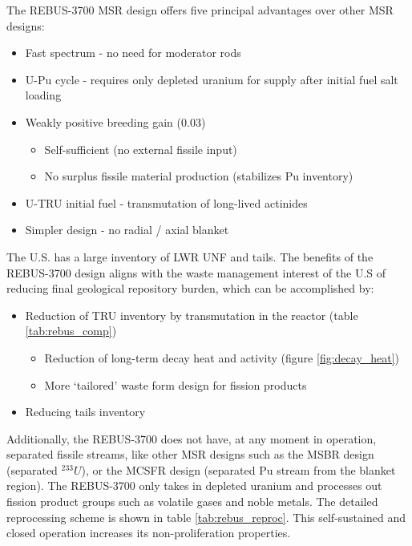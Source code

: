 The REBUS-3700 \gls{MSR} design offers five principal
advantages over other \gls{MSR} designs:
\begin{itemize}
	\item Fast spectrum - no need for moderator rods 
	\item U-Pu cycle - requires only depleted uranium for supply after initial fuel salt loading
	\item Weakly positive breeding gain (0.03)
	\begin{itemize}
		\item Self-sufficient (no external fissile input)
		\item No surplus fissile material production (stabilizes Pu inventory)
	\end{itemize}
	\item U-\gls{TRU} initial fuel - transmutation of long-lived actinides
	\item Simpler design - no radial / axial blanket
\end{itemize}

The U.S. has a large inventory of \gls{LWR} \gls{UNF} and tails. The benefits
of the REBUS-3700 design aligns with the waste management interest
of the U.S of reducing final geological repository burden, which can be
accomplished by:

\begin{itemize}
	\item Reduction of \gls{TRU} inventory by transmutation in the reactor (table \ref{tab:rebus_comp})
	\begin{itemize}
		\item Reduction of long-term decay heat and activity (figure \ref{fig:decay_heat})
		\item More `tailored' waste form design for fission products
	\end{itemize}
	\item Reducing tails inventory
\end{itemize}

Additionally, the REBUS-3700 does not have, at any moment in
operation, separated fissile streams, like other \gls{MSR} designs
such as the \gls{MSBR} design \cite{robertson_conceptual_1971} (separated 
$^{233}U$),
or the \gls{MCSFR} design \cite{smith_assessment_1974} (separated Pu stream from the blanket region).
The REBUS-3700 only takes in depleted uranium and processes out
fission product groups such as volatile gases and noble metals.
The detailed reprocessing scheme is shown
in table \ref{tab:rebus_reproc}. 
This self-sustained and closed operation increases its non-proliferation
properties.


